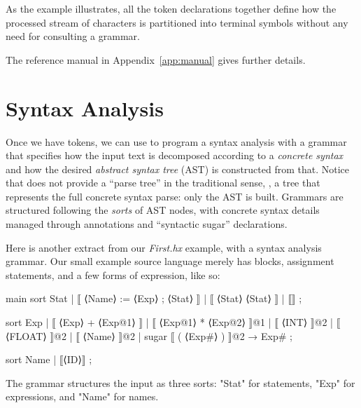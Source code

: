 \documentclass[11pt]{article} %
\begin{document}
As the example illustrates, all the token declarations together define how the processed stream of
characters is partitioned into terminal symbols without any need for consulting a grammar.

The reference manual in Appendix~\ref{app:manual} gives further details.


\section{Syntax Analysis}
\label{sec:syntax}

Once we have tokens, we can use \HAX to program a syntax analysis with a grammar that specifies how
the input text is decomposed according to a \emph{concrete syntax} and how the desired
\emph{abstract syntax tree} (AST) is constructed from that. Notice that \HAX does not provide a
``parse tree'' in the traditional sense, \ie, a tree that represents the full concrete syntax parse:
only the AST is built.  Grammars are structured following the \emph{sorts} of AST nodes, with
concrete syntax details managed through annotations and ``syntactic sugar'' declarations.

\begin{example}\label{ex:syntax}
  Here is another extract from our \emph{First.hx} example, with a syntax analysis grammar. Our
  small example source language merely has blocks, assignment statements, and a few forms of
  expression, like so:
\begin{hacs}[xleftmargin=\parindent,xrightmargin=2em,numbers=right]
main sort Stat  | ⟦ ⟨Name⟩ := ⟨Exp⟩ ; ⟨Stat⟩ ⟧
                | ⟦ { ⟨Stat⟩ } ⟨Stat⟩ ⟧
                | ⟦⟧ ;

sort Exp  | ⟦ ⟨Exp⟩ + ⟨Exp@1⟩ ⟧
          | ⟦ ⟨Exp@1⟩ * ⟨Exp@2⟩ ⟧@1
          | ⟦ ⟨INT⟩ ⟧@2
          | ⟦ ⟨FLOAT⟩ ⟧@2
          | ⟦ ⟨Name⟩ ⟧@2
          | sugar ⟦ ( ⟨Exp#⟩ ) ⟧@2 → Exp# ;

sort Name  | ⟦⟨ID⟩⟧ ;
\end{hacs}
  The grammar structures the input as three sorts: "Stat" for statements, "Exp" for expressions, and
  "Name" for names.
\end{example}
\end{document}
